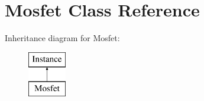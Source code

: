 \hypertarget{class_s_p_i_c_e_1_1_mosfet}{\section{Mosfet Class Reference}
\label{class_s_p_i_c_e_1_1_mosfet}
}
Inheritance diagram for Mosfet\-:\begin{figure}[H]
\begin{center}
\leavevmode
\includegraphics[height=2.000000cm]{class_s_p_i_c_e_1_1_mosfet}
\end{center}
\end{figure}
